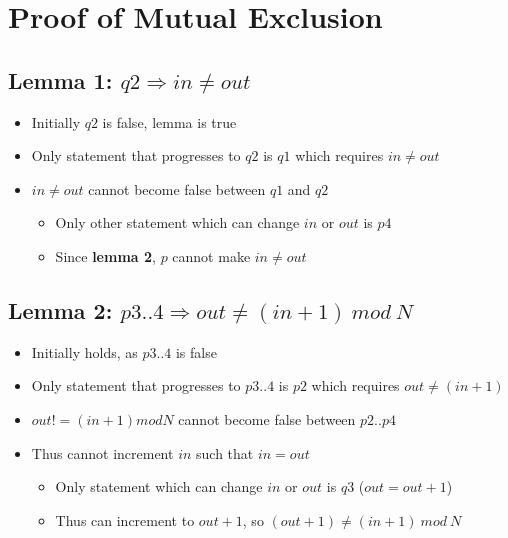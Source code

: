 \documentclass[12pt,a4paper]{article}
\begin{document}
\section{Proof of Mutual Exclusion}

\subsection*{\textbf{Lemma 1}: $q2 \Longrightarrow in \neq out$}
\begin{itemize}
    \item Initially $q2$ is false, lemma is true
    \item Only statement that progresses to $q2$ is $q1$ which requires $in \neq out$
    \item $in \neq out$ cannot become false between $q1$ and $q2$
    \begin{itemize}
        \item Only other statement which can change $in$ or $out$ is $p4$
        \item Since \textbf{lemma 2}, $p$ cannot make $in \neq out$
    \end{itemize}
\end{itemize}

\subsection*{\textbf{Lemma 2}: $p3..4 \Longrightarrow out \neq (in+1)\ mod\ N$}
\begin{itemize}
    \item Initially holds, as $p3..4$ is false
    \item Only statement that progresses to $p3..4$ is $p2$ which requires $out \neq (in+1)$
    \item $out != (in + 1) mod N$ cannot become false between $p2..p4$
    \item Thus cannot increment $in$ such that $in = out$
    \begin{itemize}
        \item Only statement which can change $in$ or $out$ is $q3$ ($out = out + 1$)
        \item Thus can increment to $out+1$, so $(out+1) \neq (in+1)\ mod\ N$
    \end{itemize}
\end{itemize}
\end{document}

